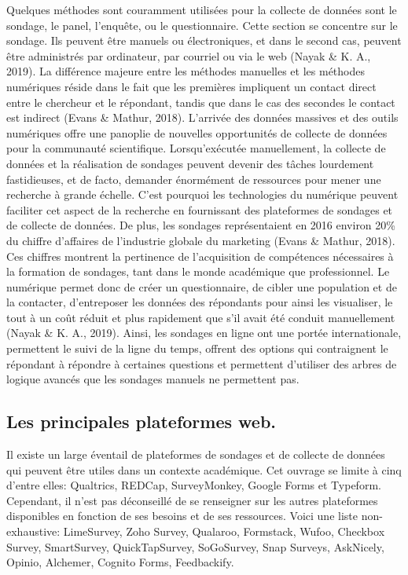 \documentclass[
  letterpaper,
]{scrbook}
\begin{document}
\hfill\break
Quelques méthodes sont couramment utilisées pour la collecte de données
sont le sondage, le panel, l'enquête, ou le questionnaire. Cette section
se concentre sur le sondage. Ils peuvent être manuels ou électroniques,
et dans le second cas, peuvent être administrés par ordinateur, par
courriel ou via le web (Nayak \& K. A., 2019). La différence majeure
entre les méthodes manuelles et les méthodes numériques réside dans le
fait que les premières impliquent un contact direct entre le chercheur
et le répondant, tandis que dans le cas des secondes le contact est
indirect (Evans \& Mathur, 2018). L'arrivée des données massives et des
outils numériques offre une panoplie de nouvelles opportunités de
collecte de données pour la communauté scientifique. Lorsqu'exécutée
manuellement, la collecte de données et la réalisation de sondages
peuvent devenir des tâches lourdement fastidieuses, et de facto,
demander énormément de ressources pour mener une recherche à grande
échelle. C'est pourquoi les technologies du numérique peuvent faciliter
cet aspect de la recherche en fournissant des plateformes de sondages et
de collecte de données. De plus, les sondages représentaient en 2016
environ 20\% du chiffre d'affaires de l'industrie globale du marketing
(Evans \& Mathur, 2018). Ces chiffres montrent la pertinence de
l'acquisition de compétences nécessaires à la formation de sondages,
tant dans le monde académique que professionnel. Le numérique permet
donc de créer un questionnaire, de cibler une population et de la
contacter, d'entreposer les données des répondants pour ainsi les
visualiser, le tout à un coût réduit et plus rapidement que s'il avait
été conduit manuellement (Nayak \& K. A., 2019). Ainsi, les sondages en
ligne ont une portée internationale, permettent le suivi de la ligne du
temps, offrent des options qui contraignent le répondant à répondre à
certaines questions et permettent d'utiliser des arbres de logique
avancés que les sondages manuels ne permettent pas.

\hypertarget{les-principales-plateformes-web.}{%
\subsection{Les principales plateformes
web.}\label{les-principales-plateformes-web.}}

\hfill\break
Il existe un large éventail de plateformes de sondages et de collecte de
données qui peuvent être utiles dans un contexte académique. Cet ouvrage
se limite à cinq d'entre elles: Qualtrics, REDCap, SurveyMonkey, Google
Forms et Typeform. Cependant, il n'est pas déconseillé de se renseigner
sur les autres plateformes disponibles en fonction de ses besoins et de
ses ressources. Voici une liste non-exhaustive: LimeSurvey, Zoho Survey,
Qualaroo, Formstack, Wufoo, Checkbox Survey, SmartSurvey,
QuickTapSurvey, SoGoSurvey, Snap Surveys, AskNicely, Opinio, Alchemer,
Cognito Forms, Feedbackify.
\end{document}
